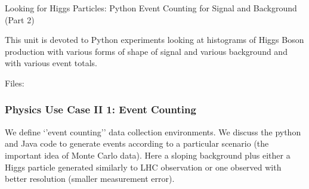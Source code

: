 Looking for Higgs Particles: Python Event Counting for Signal and
Background (Part 2)


This unit is devoted to Python experiments looking at histograms of
Higgs Boson production with various forms of shape of signal and various
background and with various event totals.


Files:









\subsubsection{Physics Use Case II 1: Event
Counting}\label{physics-use-case-ii-2-event-counting}

We define `'event counting'' data collection environments. We discuss
the python and Java code to generate events according to a particular
scenario (the important idea of Monte Carlo data). Here a sloping
background plus either a Higgs particle generated similarly to LHC
observation or one observed with better resolution (smaller measurement
error).


